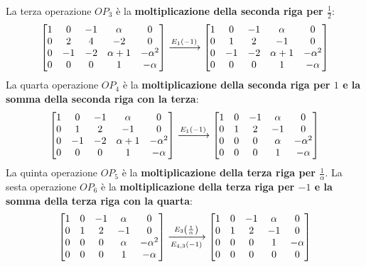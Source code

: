 \documentclass[a4paper]{article}
\makeatletter
\newenvironment{rowequmatbra}[1]{\left[\array{@{}#1@{}}}{\endarray\right]}
\makeatother
\begin{document}
	La terza operazione $OP_{3}$ è la \textbf{moltiplicazione della seconda riga per $\frac{1}{2}$}:
	\begin{equation*}
		\begin{rowequmatbra}{ccccc}
			1		& 0 	& -1		& \alpha		& 0				\\
			0		& 2 	& 4			& -2			& 0				\\
			0 		& -1	& -2		& \alpha+1		& -\alpha^{2}	\\
			0		& 0		& 0			& 1				& -\alpha
		\end{rowequmatbra} \xlongrightarrow{E_{1}\left(-1\right)}
		\begin{rowequmatbra}{ccccc}
			1		& 0 	& -1		& \alpha		& 0				\\
			0		& 1 	& 2			& -1			& 0				\\
			0 		& -1	& -2		& \alpha+1		& -\alpha^{2}	\\
			0		& 0		& 0			& 1				& -\alpha
		\end{rowequmatbra}
	\end{equation*}
	La quarta operazione $OP_{4}$ è la \textbf{moltiplicazione della seconda riga per $1$ e la somma della seconda riga con la terza}:
	\begin{equation*}
		\begin{rowequmatbra}{ccccc}
			1		& 0 	& -1		& \alpha		& 0				\\
			0		& 1 	& 2			& -1			& 0				\\
			0 		& -1	& -2		& \alpha+1		& -\alpha^{2}	\\
			0		& 0		& 0			& 1				& -\alpha
		\end{rowequmatbra} \xlongrightarrow{E_{1}\left(-1\right)}
		\begin{rowequmatbra}{ccccc}
			1		& 0 	& -1		& \alpha		& 0				\\
			0		& 1 	& 2			& -1			& 0				\\
			0 		& 0		& 0			& \alpha		& -\alpha^{2}	\\
			0		& 0		& 0			& 1				& -\alpha
		\end{rowequmatbra}
	\end{equation*}
	La quinta operazione $OP_{5}$ è la \textbf{moltiplicazione della terza riga per $\frac{1}{\alpha}$}. La sesta operazione $OP_{6}$ è la \textbf{moltiplicazione della terza riga per $-1$ e la somma della terza riga con la quarta}:
	\begin{equation*}
		\begin{rowequmatbra}{ccccc}
			1		& 0 	& -1		& \alpha		& 0				\\
			0		& 1 	& 2			& -1			& 0				\\
			0 		& 0		& 0			& \alpha		& -\alpha^{2}	\\
			0		& 0		& 0			& 1				& -\alpha
		\end{rowequmatbra} \xlongrightarrow[E_{4,3}\left(-1\right)]{E_{3}\left(\frac{1}{\alpha}\right)}
		\begin{rowequmatbra}{ccccc}
			1		& 0 	& -1		& \alpha		& 0				\\
			0		& 1 	& 2			& -1			& 0				\\
			0 		& 0		& 0			& 1				& -\alpha		\\
			0		& 0		& 0			& 0				& 0
		\end{rowequmatbra}
	\end{equation*}
\end{document}

